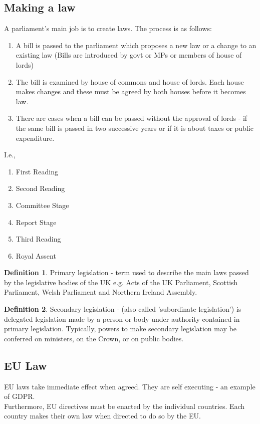 \documentclass[a4paper]{article}
\theoremstyle{plain}
\theoremstyle{definition}
\newtheorem{defn}{Definition}[section]
\theoremstyle{remark}
\begin{document}
\subsection{Making a law}
A parliament's main job is to create laws. The process is as follows:
\begin{enumerate}
	\item A bill is passed to the parliament which proposes a new law or a change to an existing law (Bills are introduced by govt or MPs or members of house of lords)
	\item The bill is examined by house of commons and house of lords. Each house makes changes and these must be agreed by both houses before it becomes law.
	\item There are cases when a bill can be passed without the approval of lords - if the same bill is passed in two successive years or if it is about taxes or public expenditure.
\end{enumerate}
I.e.,
\begin{enumerate}
	\item First Reading
	\item Second Reading
	\item Committee Stage
	\item Report Stage
	\item Third Reading
	\item Royal Assent
\end{enumerate}
\begin{defn}
	Primary legislation - term used to describe the main laws passed by the legislative bodies of the UK e.g. Acts of the UK Parliament, Scottish Parliament, Welsh Parliament and Northern Ireland Assembly. 
\end{defn}
\begin{defn}
	Secondary legislation - (also called 'subordinate legislation') is delegated legislation made by a person or body under authority contained in primary legislation. Typically, powers to make secondary legislation may be conferred on ministers, on the Crown, or on public bodies.
\end{defn}
\subsection{EU Law}
EU laws take immediate effect when agreed. They are self executing - an example of GDPR. \\
Furthermore, EU directives must be enacted by the individual countries. Each country makes their own law when directed to do so by the EU.
\end{document}
